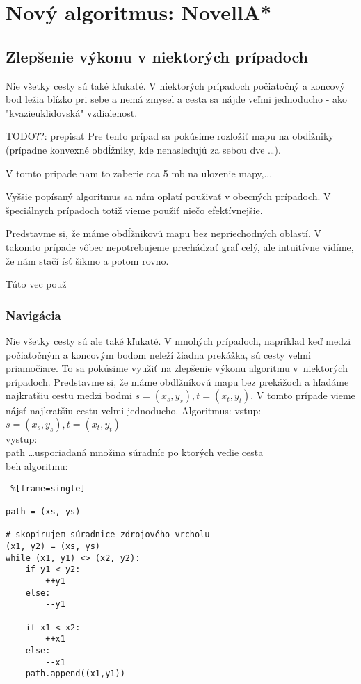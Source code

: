 \chapter{Nový algoritmus: NovellA*}

\section{Zlepšenie výkonu v niektorých prípadoch}
Nie všetky cesty sú také kľukaté. V niektorých prípadoch
počiatočný a koncový bod ležia blízko pri sebe a nemá zmysel a cesta sa nájde 
veľmi jednoducho - ako "kvazieuklidovská" vzdialenost.

TODO??: prepisat
Pre tento prípad sa pokúsime rozložiť mapu na obdĺžniky
(prípadne konvexné obdĺžniky, kde nenasledujú za sebou dve \dots).

V tomto pripade nam to zaberie cca 5 mb na ulozenie mapy,...


Vyššie popísaný algoritmus sa nám oplatí použivať v obecných prípadoch.
V špeciálnych prípadoch totiž vieme použiť niečo efektívnejšie.

Predstavme si, že máme obdĺžnikovú mapu bez nepriechodných oblastí. V takomto prípade vôbec nepotrebujeme
prechádzať graf 
celý, ale intuitívne vidíme, že nám stačí ísť šikmo a potom rovno.

Túto vec použ
\subsection{Navigácia}


Nie všetky cesty sú ale také kľukaté. V mnohých prípadoch, napríklad keď medzi počiatočným a koncovým bodom neleží žiadna prekážka, 
sú cesty veľmi priamočiare. To sa pokúsime využiť na zlepšenie výkonu algoritmu v~niektorých prípadoch. 
Predstavme si, že máme obdlžníkovú mapu bez prekážoch a hľadáme najkratšiu cestu medzi bodmi $s=(x_s,y_s), t=(x_t,y_t)$.
V tomto prípade vieme nájsť najkratšiu cestu veľmi jednoducho.
Algoritmus:
vstup: \\
$s=(x_s,y_s), t=(x_t,y_t)$ \\
vystup:\\
path \dots usporiadaná množina súradníc po ktorých vedie cesta\\
beh algoritmu:\\


\lstset{language=Python}          
\begin{lstlisting} %[frame=single]  

path = (xs, ys)

# skopirujem súradnice zdrojového vrcholu
(x1, y2) = (xs, ys) 
while (x1, y1) <> (x2, y2):
	if y1 < y2:
		++y1
	else:
		--y1

	if x1 < x2:
		++x1
	else:
		--x1
	path.append((x1,y1))
\end{lstlisting}

